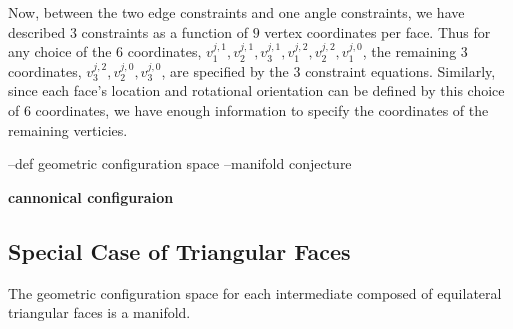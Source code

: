 Now, between the two edge constraints and one angle constraints, we have described $3$ constraints as a function of $9$ vertex coordinates per face. Thus for any choice of the $6$ coordinates, $v^{j,1}_1, v^{j,1}_2, v^{j,1}_3, v^{j,2}_1, v^{j,2}_2, v^{j,0}_1$, the remaining $3$ coordinates, $v^{j,2}_3, v^{j,0}_2, v^{j,0}_3$, are specified by the $3$ constraint equations. Similarly, since each face's location and rotational orientation can be defined by this choice of $6$ coordinates, we have enough information to specify the coordinates of the remaining verticies. 







--def geometric configuration space
--manifold conjecture


\begin{mydef}
\textbf{cannonical configuraion}
\end{mydef}

\subsection{Special Case of Triangular Faces}


\begin{mycon}
The geometric configuration space for each intermediate composed of equilateral triangular faces is a manifold.
\end{mycon}

%


